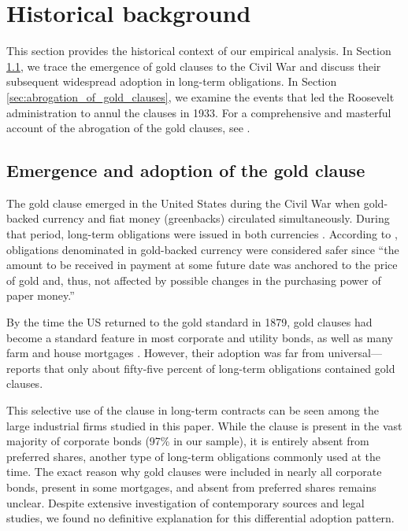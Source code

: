 \section{Historical background}
\label{sec:historical_background}

\noindent This section provides the historical context of our empirical analysis. In Section \ref{sec:emergence_of_gold_clauses}, we trace the emergence of gold clauses to the Civil War and discuss their subsequent widespread adoption in long-term obligations. In Section \ref{sec:abrogation_of_gold_clauses}, we examine the events that led the Roosevelt administration to annul the clauses in 1933. For a comprehensive and masterful account of the abrogation of the gold clauses, see \cite{Edwards2018}.

\subsection{Emergence and adoption of the gold clause}
\label{sec:emergence_of_gold_clauses}

\noindent The gold clause emerged in the United States during the Civil War when gold-backed currency and fiat money (greenbacks) circulated simultaneously. During that period, long-term obligations were issued in both currencies \citep{Payne2025}. According to \cite{Edwards2018}, obligations denominated in gold-backed currency were considered safer since ``the amount to be received in payment at some future date was anchored to the price of gold and, thus, not affected by possible changes in the purchasing power of paper money.''

By the time the US returned to the gold standard in 1879, gold clauses had become a standard feature in most corporate and utility bonds, as well as many farm and house mortgages \citep{Jackson1941, Edwards2018}. However, their adoption was far from universal---\cite{Dam1983} reports that only about fifty-five percent of long-term obligations contained gold clauses.

This selective use of the clause in long-term contracts can be seen among the large industrial firms studied in this paper. While the clause is present in the vast majority of corporate bonds (97\% in our sample), it is entirely absent from preferred shares, another type of long-term obligations commonly used at the time. The exact reason why gold clauses were included in nearly all corporate bonds, present in some mortgages, and absent from preferred shares remains unclear. Despite extensive investigation of contemporary sources and legal studies, we found no definitive explanation for this differential adoption pattern.

